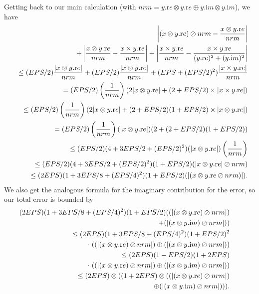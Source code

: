 \phantom{someone}
Getting back to our main calculation (with $nrm = y.{\mathrm re} \otimes y.{\mathrm re} \oplus y.{\mathrm im} \otimes y.{\mathrm im}$), we
have
\begin{eqnarray*}
&&\hskip-16pt\left|(x \otimes y.{\mathrm re}) \oslash nrm - {x \otimes y.{\mathrm re} \over nrm}\right|\\
&&\quad +
\left|{x \otimes y.{\mathrm re} \over nrm} - {x \times y.{\mathrm re} \over nrm}\right| +
\left|{x \times y.{\mathrm re} \over nrm} - 
{x \times y.{\mathrm re}  \over (y.{\mathrm re})^2 + (y.{\mathrm im})^2}\right|\\
&&  \le(EPS/2){|x \otimes y.{\mathrm re}| \over nrm} +
        (EPS/2){|x \otimes   y.{\mathrm re}| \over nrm} +
(EPS + (EPS/2)^2) {|x \times   y.{\mathrm re}| \over nrm}\\
&&  =(EPS/2)\left({1 \over nrm}\right)(2 |x \otimes y.{\mathrm re}| +
(2 + EPS/2) \times |x \times y.{\mathrm re}| )\\
&&  \le (EPS/2)\left({1 \over nrm}\right)(2 |x \otimes y.{\mathrm re}| +
(2 + EPS/2)(1 + EPS/2) \times |x \otimes y.{\mathrm re}| )\\
&&\quad = (EPS/2)\left({1 \over nrm}\right)(|x \otimes y.{\mathrm re}|)
(2 + (2 + EPS/2)(1+EPS/2))\\
&&  \le (EPS/2)(4 + 3EPS/2 + (EPS/2)^2)(|x \otimes y.{\mathrm re}|)\left({1 \over nrm}\right)\\
&& \le (EPS/2)(4 + 3EPS/2 +
(EPS/2)^2)(1+EPS/2)(|x \otimes y.{\mathrm re}| \oslash nrm)\\
&&  \le (2EPS)(1 + 3EPS/8 + (EPS/4)^2)(1+EPS/2)(|(x \otimes y.{\mathrm
re} \oslash nrm)|).
\end{eqnarray*}
 We also get the analogous formula for the imaginary contribution for the error, so our total error is
bounded by
\begin{eqnarray*}
&&\hskip-24pt (2EPS)(1 + 3EPS/8 + (EPS/4)^2)(1+EPS/2)((|(x \otimes y.{\mathrm re})\oslash nrm|)\\
&&\quad+(|(x \otimes y.{\mathrm
im})\oslash nrm|))\\
&& \le (2EPS)(1 + 3EPS/8 + (EPS/4)^2)(1+EPS/2)^2\\
&&\quad\cdot\ ((|(x \otimes y.{\mathrm re})\oslash nrm|)  \oplus (|(x \otimes
y.{\mathrm im})\oslash nrm|))\\
&&  \le (2EPS)(1 - EPS/2)(1+ 2EPS)\\
&&\quad\cdot\ ((|(x \otimes y.{\mathrm re})\oslash nrm|) \oplus (|(x \otimes y.{\mathrm
im})\oslash nrm|))\\
&&  \le (2EPS) \otimes ((1+ 2EPS) \otimes ((|(x \otimes y.{\mathrm re})\oslash nrm|)\\
&&\quad  \oplus (|(x \otimes y.{\mathrm
im})\oslash nrm|))).
\end{eqnarray*}


